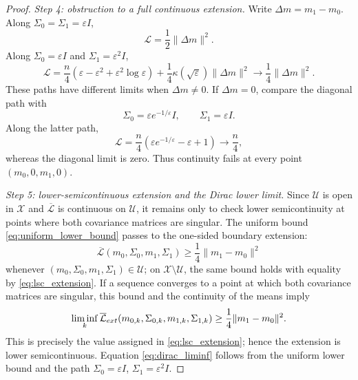 \documentclass[10pt,a4paper]{amsart}
\begin{document}
\begin{proof}
\medskip
\noindent\textit{Step 4: obstruction to a full continuous extension.}
Write $\Delta m=m_1-m_0$. Along $\Sigma_0=\Sigma_1=\varepsilon I$,
\[
\mathcal{L}=\frac12\lVert\Delta m\rVert^2.
\]
Along $\Sigma_0=\varepsilon I$ and $\Sigma_1=\varepsilon^2I$,
\[
\mathcal{L}
=\frac{n}{4}\left(\varepsilon-\varepsilon^2+\varepsilon^2\log\varepsilon\right)
+\frac14\kappa(\sqrt{\varepsilon})\lVert\Delta m\rVert^2
\longrightarrow\frac14\lVert\Delta m\rVert^2.
\]
These paths have different limits when $\Delta m\neq0$. If $\Delta m=0$, compare the diagonal path with
\[
\Sigma_0=\varepsilon e^{-1/\varepsilon}I,
\qquad
\Sigma_1=\varepsilon I.
\]
Along the latter path,
\[
\mathcal{L}
=\frac{n}{4}\left(\varepsilon e^{-1/\varepsilon}-\varepsilon+1\right)
\longrightarrow\frac n4,
\]
whereas the diagonal limit is zero. Thus continuity fails at every point $(m_0,0,m_1,0)$.

\medskip
\noindent\textit{Step 5: lower-semicontinuous extension and the Dirac lower limit.}
Since $\mathcal{U}$ is open in $\mathcal{X}$ and $\overline{\mathcal{L}}$ is continuous on $\mathcal{U}$, it remains only to check lower semicontinuity at points where both covariance matrices are singular. The uniform bound \eqref{eq:uniform_lower_bound} passes to the one-sided boundary extension:
\[
\overline{\mathcal{L}}(m_0,\Sigma_0,m_1,\Sigma_1)
\geq\frac14\lVert m_1-m_0\rVert^2
\]
whenever $(m_0,\Sigma_0,m_1,\Sigma_1)\in\mathcal{U}$; on $\mathcal X\setminus\mathcal U$, the same bound holds with equality by \eqref{eq:lsc_extension}. If a sequence converges to a point at which both covariance matrices are singular, this bound and the continuity of the means imply
\[
\liminf_k\overline{\mathcal{L}}_{\rm ext}(m_{0,k},\Sigma_{0,k},m_{1,k},\Sigma_{1,k})
\geq\frac14\lVert m_1-m_0\rVert^2.
\]
This is precisely the value assigned in \eqref{eq:lsc_extension}; hence the extension is lower semicontinuous. Equation \eqref{eq:dirac_liminf} follows from the uniform lower bound and the path $\Sigma_0=\varepsilon I$, $\Sigma_1=\varepsilon^2I$.
\end{proof}
\end{document}
